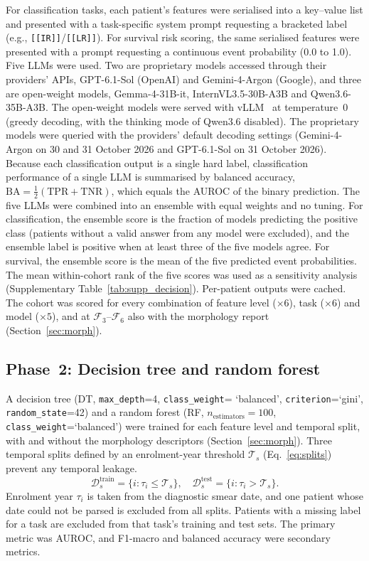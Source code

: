 \documentclass[pdflatex,sn-nature]{sn-jnl}
\begin{document}
For classification tasks, each patient's features were serialised into
a key--value list and presented with a task-specific system prompt
requesting a bracketed label (e.g., \texttt{[[IR]]}/\texttt{[[LR]]}).
For survival risk scoring, the same serialised features were presented
with a prompt requesting a continuous event probability (0.0 to 1.0).
Five LLMs were used.
Two are proprietary models accessed through their providers' APIs,
GPT-6.1-Sol (OpenAI) and Gemini-4-Argon (Google), and three are
open-weight models, Gemma-4-31B-it, InternVL3.5-30B-A3B and
Qwen3.6-35B-A3B.
The open-weight models were served with vLLM~\cite{[CITE:vLLM]} at
temperature~$0$ (greedy decoding, with the thinking mode of Qwen3.6
disabled).
The proprietary models were queried with the providers' default
decoding settings (Gemini-4-Argon on 30 and 31 October 2026 and
GPT-6.1-Sol on 31 October 2026).
Because each classification output is a single hard label,
classification performance of a single LLM is summarised by balanced
accuracy, $\mathrm{BA}=\tfrac{1}{2}(\mathrm{TPR}+\mathrm{TNR})$, which
equals the AUROC of the binary prediction.
The five LLMs were combined into an ensemble with equal weights and no
tuning.
For classification, the ensemble score is the fraction of models
predicting the positive class (patients without a valid answer from any
model were excluded), and the ensemble label is positive when at least
three of the five models agree.
For survival, the ensemble score is the mean of the five predicted
event probabilities.
The mean within-cohort rank of the five scores was used as a
sensitivity analysis (Supplementary Table~\ref{tab:supp_decision}).
Per-patient outputs were cached.
The cohort was scored for every combination of feature level
($\times 6$), task ($\times 6$) and model ($\times 5$), and at
$\mathcal{F}_3$--$\mathcal{F}_6$ also with the morphology report
(Section~\ref{sec:morph}).

\subsection{Phase~2: Decision tree and random forest}\label{sec:dt}

A decision tree (DT, \texttt{max\_depth}=4, \texttt{class\_weight}=%
`balanced', \texttt{criterion}=`gini', \texttt{random\_state}=42)
and a random forest (RF, $n_\text{estimators}=100$,
\texttt{class\_weight}=`balanced') were trained for each feature level
and temporal split, with and without the morphology descriptors
(Section~\ref{sec:morph}).
Three temporal splits defined by an enrolment-year threshold
$\mathcal{T}_s$ (Eq.~\ref{eq:splits}) prevent any temporal leakage.
\begin{equation}
\mathcal{D}_s^{\text{train}} = \{i : \tau_i \leq \mathcal{T}_s\},
\quad
\mathcal{D}_s^{\text{test}} = \{i : \tau_i > \mathcal{T}_s\}.
\label{eq:splits}
\end{equation}
Enrolment year $\tau_i$ is taken from the diagnostic smear date, and
one patient whose date could not be parsed is excluded from all splits.
Patients with a missing label for a task are excluded from that task's
training and test sets.
The primary metric was AUROC, and F1-macro and balanced accuracy were
secondary metrics.
\end{document}
